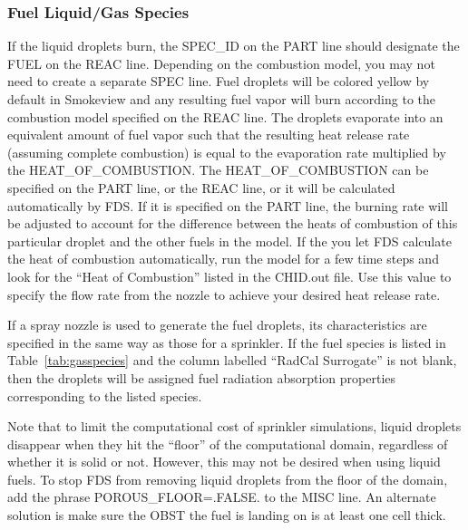 \documentclass[11pt]{book}
\begin{document}
\subsubsection{Fuel Liquid/Gas Species}
\label{info:fuel_droplets}
\label{spray_burner}

If the liquid droplets burn, the {\ct SPEC\_ID} on the {\ct PART} line should designate the {\ct FUEL} on the {\ct REAC} line. Depending on the combustion model, you may not need to create a separate {\ct SPEC} line. Fuel droplets will be colored yellow by default in Smokeview and any resulting fuel vapor will burn according to the combustion model specified on the {\ct REAC} line. The droplets evaporate into an equivalent amount of fuel vapor such that the resulting heat release rate (assuming complete combustion) is equal to the evaporation rate multiplied by the {\ct HEAT\_OF\_COMBUSTION}. The {\ct HEAT\_OF\_COMBUSTION} can be specified on the {\ct PART} line, or the {\ct REAC} line, or it will be calculated automatically by FDS. If it is specified on the {\ct PART} line, the burning rate will be adjusted to account for the difference between the heats of combustion of this particular droplet and the other fuels in the model. If the you let FDS calculate the heat of combustion automatically, run the model for a few time steps and look for the ``Heat of Combustion'' listed in the {\ct CHID.out} file. Use this value to specify the flow rate from the nozzle to achieve your desired heat release rate.

If a spray nozzle is used to generate the fuel droplets, its characteristics are specified in the same way as those for a sprinkler.  If the fuel species is listed in Table~\ref{tab:gasspecies} and the column labelled ``RadCal Surrogate'' is not blank, then the droplets will be assigned fuel radiation absorption properties corresponding to the listed species.

Note that to limit the computational cost of sprinkler simulations, liquid droplets disappear when they hit the ``floor'' of the computational domain, regardless of whether it is solid or not. However, this may not be desired when using liquid fuels. To stop FDS from removing liquid droplets from the floor of the domain, add the phrase {\ct POROUS\_FLOOR=.FALSE.} to the {\ct MISC} line. An alternate solution is make sure the {\ct OBST} the fuel is landing on is at least one cell thick.
\end{document}
